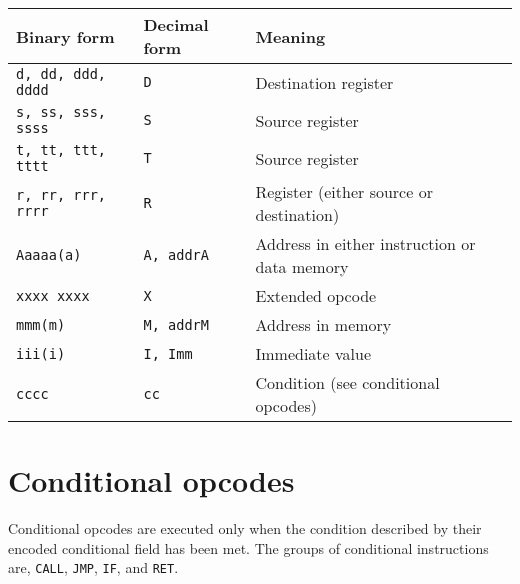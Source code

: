 \documentclass[oneside,english,a4paper,10pt,oneside,openany,final]{memoir}
\newcommand{\Opcode}[1]{\texttt{#1}}
\begin{document}
\begin{table}[H]
\centering
\begin{tabular}{|l|l|l|}
\hline
\textbf{Binary form}          & \textbf{Decimal form}          & \textbf{Meaning}                             \\ \hline
\texttt{d, dd, ddd, dddd}     & \texttt{D}                     & Destination register                         \\ \hline
\texttt{s, ss, sss, ssss}     & \texttt{S}                     & Source register                              \\ \hline
\texttt{t, tt, ttt, tttt}     & \texttt{T}                     & Source register                              \\ \hline
\texttt{r, rr, rrr, rrrr}     & \texttt{R}                     & Register (either source or destination)      \\ \hline
\texttt{Aaaaa(a)}             & \texttt{A, addrA}              & Address in either instruction or data memory \\ \hline
\texttt{xxxx xxxx}            & \texttt{X}                     & Extended opcode                              \\ \hline
\texttt{mmm(m)}               & \texttt{M, addrM}              & Address in memory                            \\ \hline
\texttt{iii(i)}               & \texttt{I, Imm}                & Immediate value                              \\ \hline
\texttt{cccc}                 & \texttt{cc}                    & Condition (see conditional opcodes)          \\ \hline
\end{tabular}
\end{table}

\pagebreak{}

\section{Conditional opcodes}

Conditional opcodes are executed only when the condition described by their encoded conditional field has been met.
The groups of conditional instructions are, \Opcode{CALL}, \Opcode{JMP}, \Opcode{IF}, and \Opcode{RET}.
\end{document}
